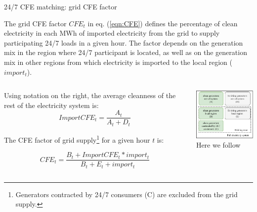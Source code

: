\begin{frame}{24/7 CFE matching: grid CFE factor}

  {\footnotesize

  The \alert{grid CFE factor} $CFE_t$ in eq. (\ref{eqn:CFE}) defines the percentage of clean electricity in each MWh of imported electricity from the grid to supply participating 24/7 loads in a given hour. The factor depends on the generation mix in the region where 24/7 participant is located, as well as on the generation mix in other regions from which electricity is imported to the local region ($import_t$).

  \begin{columns}
    \begin{column}{8cm}
    Using notation on the right, the average cleanness of the rest of the electricity system is:   
  \begin{equation*}
  ImportCFE_t = \frac{A_t}{A_t + D_t}
  \end{equation*}

  The CFE factor of grid supply\footnote{\scriptsize{Generators contracted by 24/7 consumers (C) are excluded from the grid supply.}} for a given hour $t$ is:

  \begin{equation*}
  CFE_t = \frac{B_t + ImportCFE_t * import_t}{B_t + E_t + import_t}
  \end{equation*}    

  \end{column}
  \begin{column}{5cm}
  \centering
  \includegraphics[width=4.5cm]{images/cfe.png} \\
  \scriptsize{Here we follow }
  \end{column}
    
  \end{columns}
  \noindent{}
  }
\end{frame}


